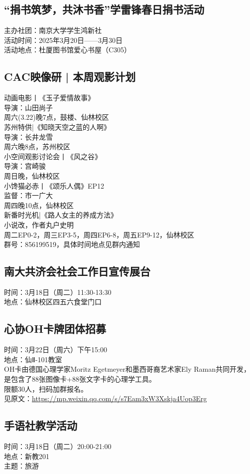 \documentclass[letterpaper, 12pt]{article}
\begin{document}
\begin{multicols}{2}
\subsection{“捐书筑梦，共沐书香”学雷锋春日捐书活动}
主办社团：南京大学学生鸿新社\\
活动时间：2025年3月20日——3月30日\\
活动地点：杜厦图书馆爱心书屋（C305）\\

\subsection{CAC映像研 | 本周观影计划}
动画电影丨《玉子爱情故事》\\
导演：山田尚子\\
周六(3.22)晚7点，鼓楼、仙林校区\\
苏州特供|《知晓天空之蓝的人啊》\\
导演：长井龙雪\\
周六晚8点，苏州校区\\
小空间观影讨论会丨《风之谷》\\
导演：宫崎骏\\
周日晚，仙林校区\\
小馋猫必赤丨《颂乐人偶》EP12\\
监督：市一广大\\
周四晚10点，仙林校区\\
新番时光机|《路人女主的养成方法》\\
小说改，作者丸户史明\\
周二EP0-2，周三EP3-5，周四EP6-8，周五EP9-12，仙林校区\\
群号：856199519，具体时间地点见群内通知\\


\subsection{南大共济会社会工作日宣传展台}
时间：3月18日（周二）11:30-13:30\\
地点：仙林校区四五六食堂门口\\

\subsection{心协OH卡牌团体招募}
时间：3月22日（周六）下午15:00\\
地点：仙Ⅱ-101教室\\
OH卡由德国心理学家Moritz Egetmeyer和墨西哥裔艺术家Ely Raman共同开发，是包含了88张图像卡+88张文字卡的心理学工具。\\
限额30人，扫码加群报名。\\
见原文：\url{https://mp.weixin.qq.com/s/s7Eam3xW3Xskja4Uop3Erg}

\subsection{手语社教学活动}
时间：3月18日（周二）20:00-21:00\\
地点：新教201\\
主题：旅游\\
\end{multicols}
\end{document}
